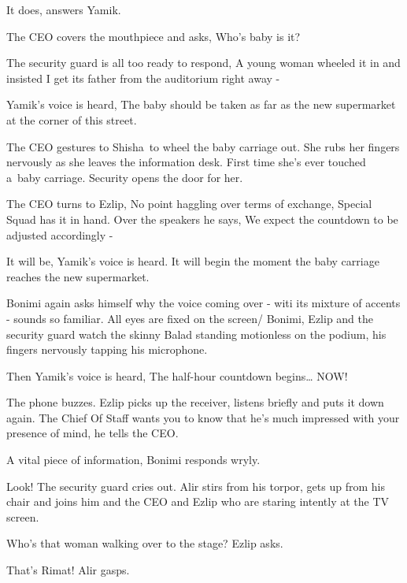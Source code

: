 \documentclass[12pt]{book}
\begin{document}
{\textquotedbl}It does,{\textquotedbl} answers Yamik{.}

The CEO covers the mouthpiece and asks, {\textquotedbl}Who's baby is it?{\textquotedbl}

The security guard is all too ready to respond, {\textquotedbl}A young{ }woman
wheeled it in and insisted I get its father from the auditorium right away -{\textquotedbl}

Yamik's voice is heard, {\textquotedbl}The baby should be taken as far as the new supermarket at the corner of this
street.{\textquotedbl}

The CEO gestures to Shisha~to wheel the baby carriage out. She rubs her fingers nervously as she leaves the information
desk. First time she's ever touched a~baby carriage. Security opens the door for her.

The CEO turns to Ezlip, {\textquotedbl}No point haggling over terms of exchange, Special Squad has it in
hand.{\textquotedbl} Over the speakers he says, {\textquotedbl}We expect the countdown to be adjusted accordingly
-{\textquotedbl}

{\textquotedbl}It will be,{\textquotedbl} Yamik's voice is heard.{\textquotedbl} It will begin the moment the baby
carriage reaches{ }the new supermarket.{\textquotedbl}

Bonimi again asks himself why the voice coming over - witi its mixture of accents - sounds
so{ }familiar. All eyes are fixed on the
screen{/ }Bonimi, Ezlip and the security guard watch the skinny Balad standing
motionless on the podium, his fingers nervously tapping his microphone.

Then Yamik's voice is heard, {\textquotedbl}The half-hour countdown
begins{\dots}{ }NOW!{\textquotedbl}

The phone buzzes. Ezlip picks up the receiver, listens briefly and puts it down again. {\textquotedbl}The Chief Of Staff
wants you to know that he's much impressed with your presence of mind,{\textquotedbl} he tells the CEO.

{\textquotedbl}A vital piece of information,{\textquotedbl} Bonimi responds wryly.

{\textquotedbl}Look!{\textquotedbl} The security guard cries out. Alir stirs from his torpor, gets up from his chair and
joins him and the CEO and Ezlip who are staring intently at the TV screen.

{\textquotedbl}Who's that woman walking over to the stage?{\textquotedbl} Ezlip asks.

{\textquotedbl}That's Rimat!{\textquotedbl} Alir gasps.
\end{document}
